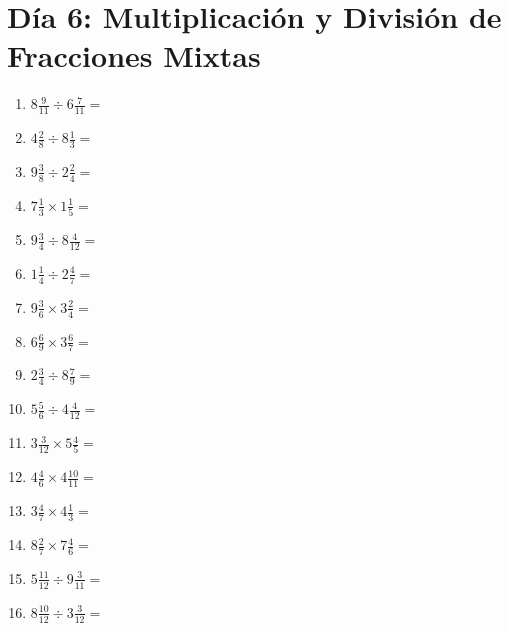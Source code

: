 \documentclass[12pt]{article}
\begin{document}
\section*{Día 6: Multiplicación y División de Fracciones Mixtas}
\begin{enumerate}
\item \large $ 8 \frac{9}{11} \div 6 \frac{7}{11} = $ \vspace{1.6cm}
\item \large $ 4 \frac{2}{8} \div 8 \frac{1}{3} = $ \vspace{1.6cm}
\item \large $ 9 \frac{3}{8} \div 2 \frac{2}{4} = $ \vspace{1.6cm}
\item \large $ 7 \frac{1}{3} \times 1 \frac{1}{5} = $ \vspace{1.6cm}
\item \large $ 9 \frac{3}{4} \div 8 \frac{4}{12} = $ \vspace{1.6cm}
\item \large $ 1 \frac{1}{4} \div 2 \frac{4}{7} = $ \vspace{1.6cm}
\item \large $ 9 \frac{3}{6} \times 3 \frac{2}{4} = $ \vspace{1.6cm}
\item \large $ 6 \frac{6}{9} \times 3 \frac{6}{7} = $ \vspace{1.6cm}
\item \large $ 2 \frac{3}{4} \div 8 \frac{7}{9} = $ \vspace{1.6cm}
\item \large $ 5 \frac{5}{6} \div 4 \frac{4}{12} = $ \vspace{1.6cm}
\newpage
\item \large $ 3 \frac{3}{12} \times 5 \frac{4}{5} = $ \vspace{1.6cm}
\item \large $ 4 \frac{4}{6} \times 4 \frac{10}{11} = $ \vspace{1.6cm}
\item \large $ 3 \frac{4}{7} \times 4 \frac{1}{3} = $ \vspace{1.6cm}
\item \large $ 8 \frac{2}{7} \times 7 \frac{4}{6} = $ \vspace{1.6cm}
\item \large $ 5 \frac{11}{12} \div 9 \frac{3}{11} = $ \vspace{1.6cm}
\item \large $ 8 \frac{10}{12} \div 3 \frac{3}{12} = $ \vspace{1.6cm}

\end{enumerate}
\end{document}
